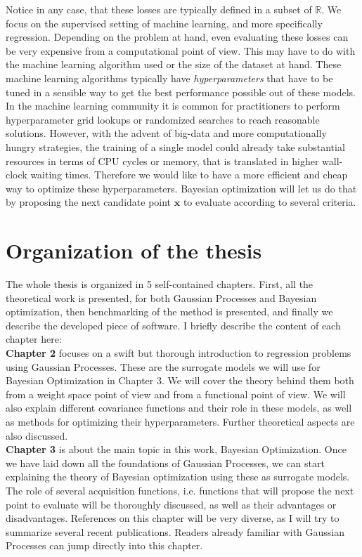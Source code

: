 \documentclass[10pt,a4paper,twoside]{book}
\begin{document}
Notice in any case, that these losses are typically defined in a subset of $\mathbb{R}$. We focus on the supervised setting of machine learning, and more specifically regression. Depending on the problem at hand, even evaluating these losses can be very expensive from a computational point of view. This may have to do with the machine learning algorithm used or the size of the dataset at hand. These machine learning algorithms typically have \textit{hyperparameters} that have to be tuned in a sensible way to get the best performance possible out of these models. In the machine learning community it is common for practitioners to perform hyperparameter grid lookups or randomized searches to reach reasonable solutions. However, with the advent of big-data and more computationally hungry strategies, the training of a single model could already take substantial resources in terms of CPU cycles or memory, that is translated in higher wall-clock waiting times. Therefore we would like to have a more efficient and cheap way to optimize these hyperparameters. Bayesian optimization will let us do that by proposing the next candidate point $\boldsymbol{x}$ to evaluate according to several criteria.

\section{Organization of the thesis}

The whole thesis is organized in 5 self-contained chapters. First, all the theoretical work is presented, for both Gaussian Processes and Bayesian optimization, then benchmarking of the method is presented, and finally we describe the developed piece of software. I briefly describe the content of each chapter here: \\

\textbf{Chapter 2} focuses on a swift but thorough introduction to regression problems using Gaussian Processes. These are the surrogate models we will use for Bayesian Optimization in Chapter 3. We will cover the theory behind them both from a weight space point of view and from a functional point of view. We will also explain different covariance functions and their role in these models, as well as methods for optimizing their hyperparameters. Further theoretical aspects are also discussed.\\

\textbf{Chapter 3} is about the main topic in this work, Bayesian Optimization. Once we have laid down all the foundations of Gaussian Processes, we can start explaining the theory of Bayesian optimization using these as surrogate models. The role of several acquisition functions, i.e. functions that will propose the next point to evaluate will be thoroughly discussed, as well as their advantages or disadvantages. References on this chapter will be very diverse, as I will try to summarize several recent publications. Readers already familiar with Gaussian Processes can jump directly into this chapter.\\
\end{document}
